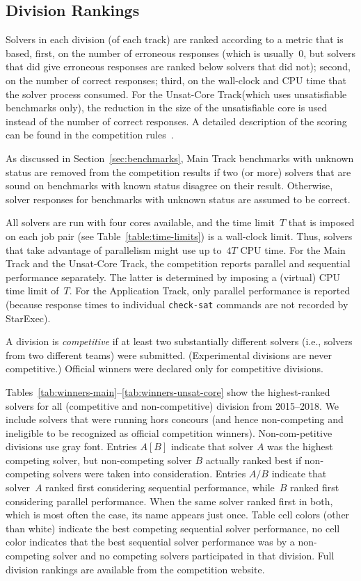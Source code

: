 \documentclass[dvipsnames,table,twoside,11pt]{article}
\newcommand{\maintrack}{Main Track\xspace}
\newcommand{\apptrack}{Application Track\xspace}
\newcommand{\ucoretrack}{Unsat-Core Track\xspace}
\begin{document}
\subsection{Division Rankings}
\label{sec:division-rankings}

Solvers in each division (of each track) are ranked according to a
metric that is based, first, on the number of erroneous responses
(which is usually~0, but solvers that did give erroneous responses are
ranked below solvers that did not); second, on the number of correct
responses; third, on the wall-clock and CPU time that the solver
process consumed.  For the \ucoretrack (which uses unsatisfiable
benchmarks only), the reduction in the size of the unsatisfiable core
is used instead of the number of correct responses.  A detailed
description of the scoring can be found in the competition
rules~\cite{rules18}.

As discussed in Section~\ref{sec:benchmarks}, \maintrack benchmarks
with unknown status are removed from the competition results if two
(or more) solvers that are sound on benchmarks with known status
disagree on their result.  Otherwise, solver responses for benchmarks
with unknown status are assumed to be correct.

All solvers are run with four cores available, and the time limit~$T$
that is imposed on each job pair (see Table~\ref{table:time-limits})
is a wall-clock limit.  Thus, solvers that take advantage of
parallelism might use up to~$4T$ CPU time.  For the \maintrack and the
\ucoretrack, the competition reports parallel and sequential
performance separately.  The latter is determined by imposing a
(virtual) CPU time limit of~$T$.  For the \apptrack, only
parallel performance is reported (because response times to individual
{\tt check-sat} commands are not recorded by StarExec).

A division is \emph{competitive} if
at least two substantially different solvers (i.e., solvers from two
different teams) were submitted.  (Experimental divisions are never
competitive.)  Official winners were declared only for competitive
divisions.

Tables~\ref{tab:winners-main}--\ref{tab:winners-unsat-core} show the
highest-ranked solvers for all (competitive and non-competitive) division from
2015--2018.
We include solvers that were running hors concours (and hence non-competing
and ineligible to be recognized as official competition winners).
Non-com-petitive divisions use gray font.
Entries $A [B]$ indicate that solver $A$ was the highest competing solver,
but non-competing solver $B$ actually ranked best if non-competing solvers
were taken into consideration.
Entries
$A/B$ indicate that solver~$A$ ranked first considering sequential
performance, while~$B$ ranked first considering parallel performance.
When the same solver ranked first in both, which is most often the
case, its name appears just once.
Table cell colors (other than white) indicate the best competing sequential
solver performance, no cell color indicates that the best sequential solver
performance was by a non-competing solver and no competing solvers participated
in that division.
Full division rankings are available from the competition website.
\end{document}
